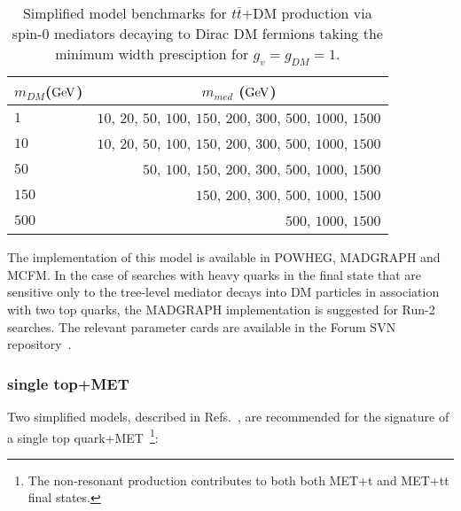 \documentclass[a4,debug,notitlepage,nobib]{tufte-handout}
\newcommand{\mdm}{\ensuremath{m_{DM}}\xspace}
\newif\ifATLAS
\newif\ifCMS
\begin{document}
\begin{table}[!ht]
\centering
\begin{tabular}{| l | r |}
\hline
\multicolumn{1}{|c|}{\mdm (${\rm GeV}$)} & \multicolumn{1}{c|}{$m_{med}$ (${\rm GeV}$)} \\
\hline
 $1$    & $10$, $20$, $50$, $100$, $150$, $200$, $300$, $500$, $1000$, $1500$  \\
 $10$   & $10$, $20$, $50$, $100$, $150$, $200$, $300$, $500$, $1000$, $1500$  \\
 $50$   &             $50$, $100$, $150$, $200$, $300$, $500$, $1000$, $1500$  \\
 $150$  &                          $150$, $200$, $300$, $500$, $1000$, $1500$  \\
 $500$  &                                               $500$, $1000$, $1500$  \\
\hline
\end{tabular}
\caption{Simplified model benchmarks for $t\bar{t}$+DM production via spin-0 mediators decaying to Dirac DM fermions taking the minimum width presciption for $g_v = g_{DM} = 1$.}
\label{tab:ttdm_benchmarks}
\end{table}

The implementation of this model is available in POWHEG, MADGRAPH
and MCFM. In the case of searches with heavy quarks in the final state
that are sensitive only to the tree-level mediator decays into DM particles
in association with two top quarks, the MADGRAPH implementation is suggested
for Run-2 searches. The relevant parameter cards are available in the Forum 
SVN repository~\cite{ForumSVN_DMTTBar}.


\ifATLAS 
The ATLAS implementation of this model using on-the-fly Madgraph
will follow the MC15 pilot request for the monophoton D5 operator~\cite{ATLAS_PowhegPythiaMC15Test}. 
\fi

\ifCMS
\textbf{[Open point: Add here implementation details for CMS..]}
\fi

\subsubsection{single top+MET}

Two simplified models, described in Refs.~\cite{Andrea:2011ws,Boucheneb:2014wza}, are recommended 
for the signature of a single top quark+MET~\footnote{The non-resonant production 
contributes to both both MET+t and MET+tt final states.}:
\end{document}
